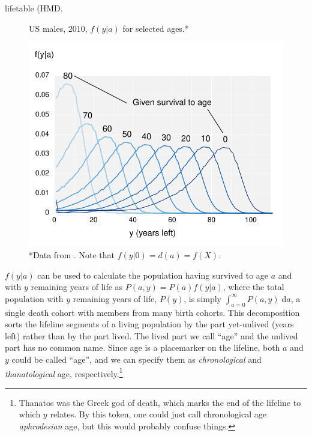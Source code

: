 \documentclass{article}
\newcommand{\dd}{\; \mathrm{d}}
\begin{document}
lifetable \citepalias(HMD.
\begin{figure}[h]
\centering
	\caption{US males, 2010, $f(y|a)$ for selected ages.*}
	\label{fig:fya}
	\includegraphics[scale=.8]{Figures/fya.pdf}	
	\caption*{*Data from . Note that $f(y|0) = d(a) = f(X)$.}
\end{figure}
$f(y|a)$ can be used to calculate the population having survived to age $a$ and
with $y$ remaining years of life as $P(a,y) = P(a)f(y|a)$, where the total
population with $y$ remaining years of life, $P(y)$, is simply $\int
_{a=0}^\infty P(a,y) \dd a$, a single death cohort with members from many birth
cohorts. This decomposition sorts the lifeline segments of a living population
by the part yet-unlived (years left) rather than by the part lived. The lived
part we call ``age'' and the unlived part has no common name. Since age is a
placemarker on the lifeline, both $a$ and $y$ could be called ``age'', and we
can specify them as \textit{chronological} and \textit{thanatological} age,
respectively.\footnote{Thanatos was the Greek god of death, which marks the end of the lifeline to which $y$ relates. By this token, one could just call chronological age \textit{aphrodesian} age, but this would probably confuse things.}
\end{document}
